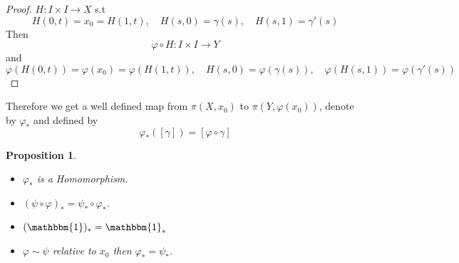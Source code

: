 \documentclass[11pt,a4paper]{article}
\theoremstyle{definition}
\theoremstyle{plain}
\newtheorem{proposition}[definition]{Proposition}
\theoremstyle{remark}
\newcommand{\1}{\mathbbm{1}}
\begin{document}
\begin{proof}
    $H \colon I \times I \to X$ s.t 
    $$H(0, t) = x_0 = H(1, t), \quad H(s, 0) = \gamma(s), \quad H(s, 1) = \gamma'(s)$$
    Then 
    $$\varphi \circ H \colon I \times I \to Y$$
    and 
    $$\varphi(H(0,t)) = \varphi(x_0) = \varphi (H(1, t)), \quad H(s,0) = \varphi(\gamma(s)) , \quad \varphi(H(s,1)) = \varphi(\gamma'(s))$$
\end{proof}

Therefore we get a well defined map from $\pi(X, x_0)$ to $\pi(Y, \varphi(x_0))$, denote by 
$\varphi_*$ and defined by 
$$\varphi_* ([\gamma]) = [\varphi \circ \gamma]$$

\begin{proposition}
    \begin{itemize}
        \item $\varphi_*$ is a Homomorphism. 
        \item $(\psi \circ \varphi)_* = \psi_* \circ \varphi_*$. 
        \item $(\mathbbm{1})_* = \mathbbm{1}_*$
        \item $\varphi \sim \psi$ relative to $x_0$ then $\varphi_* = \psi_*$.  
    \end{itemize}
\end{proposition}
\end{document}
